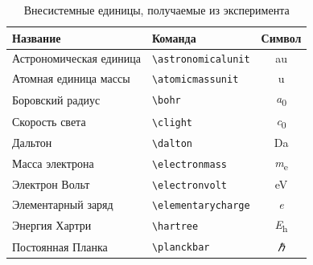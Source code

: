 \begin{table}
    \centering
    \captionsetup{justification=centering}
    \caption{Внесистемные единицы, получаемые из эксперимента}\label{tab:unit:physical}
    \begin{tabular}{llc}
        \toprule
        Название                & Команда                 & Символ                 \\
        \midrule
        Астрономическая единица & \verb|\astronomicalunit| & \si{\astronomicalunit} \\
        Атомная единица массы   & \verb|\atomicmassunit| & \si{\atomicmassunit}   \\
        Боровский радиус        & \verb|\bohr| & \si{\bohr}             \\
        Скорость света          & \verb|\clight| & \si{\clight}           \\
        Дальтон                 & \verb|\dalton| & \si{\dalton}           \\
        Масса электрона         & \verb|\electronmass| & \si{\electronmass}     \\
        Электрон Вольт          & \verb|\electronvolt| & \si{\electronvolt}     \\
        Элементарный заряд      & \verb|\elementarycharge| & \si{\elementarycharge} \\
        Энергия Хартри          & \verb|\hartree| & \si{\hartree}          \\
        Постоянная Планка       & \verb|\planckbar| & \si{\planckbar}        \\
        \bottomrule
    \end{tabular}
\end{table}

